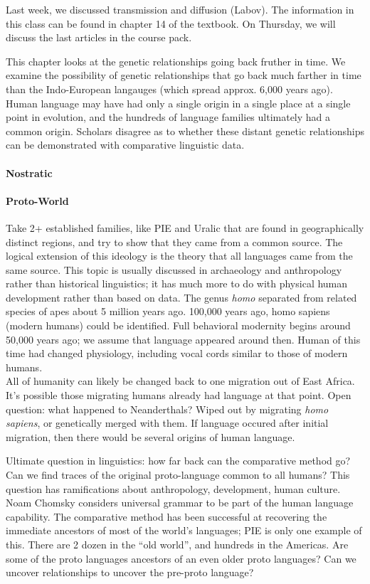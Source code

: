 \documentclass{exam}
\begin{document}
\noindent Last week, we discussed transmission and diffusion (Labov). The information in this class can be found in chapter 14 of the textbook. 
On Thursday, we will discuss the last articles in the course pack. 


This chapter looks at the genetic relationships going back fruther in time. 
We examine the possibility of genetic relationships that go back much farther in time than the Indo-European langauges (which spread approx. 6,000 years ago). 
Human language may have had only a single origin in a single place at a single point in evolution, and the hundreds of language families ultimately had a common origin. 
Scholars disagree as to whether these distant genetic relationships can be demonstrated with comparative linguistic data. 

\paragraph{Nostratic}
\paragraph{Proto-World}


\noindent Take 2+ established families, like PIE and Uralic that are found in geographically distinct regions, and try to show that they came from a common source.
The logical extension of this ideology is the theory that all languages came from the same source. 
This topic is usually discussed in archaeology and anthropology rather than historical linguistics; it has much more to do with physical human development rather than based on data. 
The genus \textit{homo} separated from related species of apes about 5 million years ago.
100,000 years ago, homo sapiens (modern humans) could be identified. 
Full behavioral modernity begins around 50,000 years ago; we assume that language appeared around then.
Human of this time had changed physiology, including vocal cords similar to those of modern humans. \\

\noindent All of humanity can likely be changed back to one migration out of East Africa. 
It's possible those migrating humans already had language at that point. 
Open question: what happened to Neanderthals? Wiped out by migrating \textit{homo sapiens}, or genetically merged with them.  
If language occured after initial migration, then there would be several origins of human language. 

Ultimate question in linguistics: how far back can the comparative method go? Can we find traces of the original proto-language common to all humans? 
This question has ramifications about anthropology, development, human culture. 
Noam Chomsky considers universal grammar to be part of the human language capability.  
The comparative method has been successful at recovering the immediate ancestors of most of the world's languages; PIE is only one example of this. 
There are 2 dozen in the ``old world'', and hundreds in the Americas. 
Are some of the proto languages ancestors of an even older proto languages?
Can we uncover relationships to uncover the pre-proto language?
\end{document}
